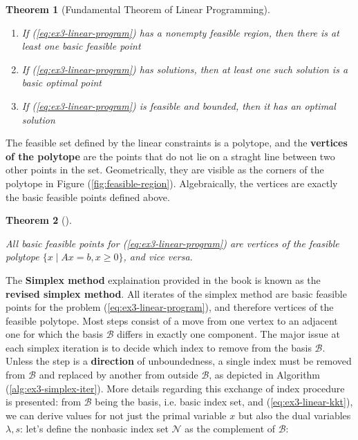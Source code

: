 \documentclass[unicode,11pt,a4paper,oneside,numbers=endperiod,openany]{scrartcl}
\newtheorem{theorem}{Theorem}[section]
\newcommand{\myth}[3]{
    \begin{theorem}[#1] 
        \label{#2} 
        #3 
    \end{theorem}
}
\begin{document}
\myth{Fundamental Theorem of Linear Programming}{th:ex3-linear-programming}{
    \hfill
    \begin{enumerate}
        \item If (\ref{eq:ex3-linear-program}) has a nonempty feasible region,
              then there is at least one basic feasible point
        \item If (\ref{eq:ex3-linear-program}) has solutions,
              then at least one such solution is a basic optimal point
        \item If (\ref{eq:ex3-linear-program}) is feasible and bounded,
              then it has an optimal solution
    \end{enumerate}
}

The feasible set defined by the linear constraints is a polytope,
and the \textbf{vertices of the polytope} are the points that do not lie on a straght line
between two other points in the set.
Geometrically,
they are visible as the corners of the polytope in Figure (\ref{fig:feasible-region}).
Algebraically, the vertices are exactly the basic feasible points defined above.

\myth{}{th:ex3-vertices-polytope}{
    All basic feasible points for (\ref{eq:ex3-linear-program})
    are vertices of the feasible polytope
    \( \{ x \mid Ax = b, x \geq 0 \} \),
    and vice versa.
}

The \textbf{Simplex method} explaination provided in the book
is known as the \textbf{revised simplex method}.
All iterates of the simplex method are basic feasible points
for the problem (\ref{eq:ex3-linear-program}),
and therefore vertices of the feasible polytope.
Most steps consist of a move from one vertex to an adjacent one
for which the basis \( \mathcal{B} \) differs in exactly one component.
The major issue at each simplex iteration is to decide which index to remove from the basis 
\( \mathcal{B} \).
Unless the step is a \textbf{direction} of unboundedness,
a single index must be removed from \( \mathcal{B} \) and replaced by another from outside 
\( \mathcal{B} \), 
as depicted in Algorithm (\ref{alg:ex3-simplex-iter}).
More details regarding this exchange of index procedure is presented:
from \( \mathcal{B} \) being the basis, i.e. basic index set,
and (\ref{eq:ex3-linear-kkt}), 
we can derive values for not just
the primal variable \( x \) but also the dual variables \( \lambda, s \):
let's define the nonbasic index set \( \mathcal{N} \) as the complement of \( \mathcal{B} \):
\end{document}
